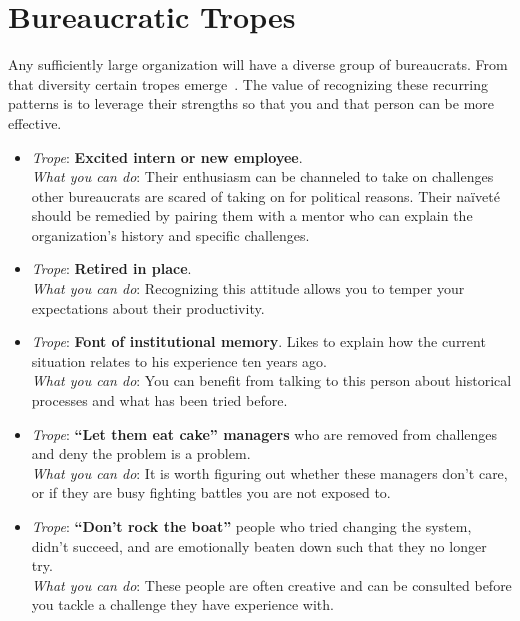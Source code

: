 \section{Bureaucratic Tropes\label{sec:tropes}}

Any sufficiently large organization will have a diverse group of bureaucrats. From that diversity certain tropes emerge~\cite{2017_Duffy}. The value of recognizing these recurring patterns is to leverage their strengths so that you and that person can be more effective. 


\begin{itemize}
    \item \textit{Trope}: \textbf{Excited intern or new employee}. \\
    \textit{What you can do}: Their enthusiasm can be channeled to take on challenges other bureaucrats are scared of taking on for political reasons. Their na\"ivet\'e 
    should be remedied by pairing them with a mentor who can explain the organization's history and specific challenges.
    
    \item \textit{Trope}: \textbf{Retired in place}. \\
    \textit{What you can do}: Recognizing this attitude allows you to temper your expectations about their productivity. 
    
    \item \textit{Trope}: \textbf{Font of institutional memory}. Likes to explain how the current situation relates to his experience ten years ago. \\
    \textit{What you can do}: You can benefit from talking to this person about historical processes and what has been tried before. 
    
    \item \textit{Trope}: \textbf{``Let them eat cake'' managers} who are removed from challenges and deny the problem is a problem. \\
    \textit{What you can do}: It is worth figuring out whether these managers don't care, or if they are busy fighting battles you are not exposed to.
    
    \item \textit{Trope}: \textbf{``Don't rock the boat''} people who tried changing the system, didn't succeed, and are emotionally beaten down such that they no longer try. \\
    \textit{What you can do}: These people are often creative and can be consulted before you tackle a challenge they have experience with. 
    

\end{itemize}
